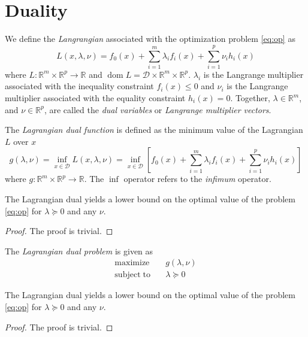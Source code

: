 \section{Duality}
We define the \emph{Langrangian} associated with the optimization problem \eqref{eq:op} as
\begin{equation}
L(x, \lambda, \nu) = f_0(x) + \sum_{i=1}^m \lambda_i f_i(x)
  + \sum_{i=1}^p \nu_i h_i(x)
\end{equation}
where $L: \mathbb{R}^m \times \mathbb{R}^p \rightarrow \mathbb{R}$ and $\operatorname{dom} L = \mathcal{D} \times \mathbb{R}^m \times \mathbb{R}^p$. $\lambda_i$ is the Langrange multiplier associated with the inequality constraint $f_i(x) \leq 0$ and $\nu_i$ is the Langrange multiplier associated with the equality constraint $h_i(x) = 0$. Together, $\lambda \in \mathbb{R}^m$, and $\nu \in \mathbb{R}^p$, are called the \emph{dual variables} or \emph{Langrange multiplier vectors}.

The \emph{Lagrangian dual function} is defined as the minimum value of the Lagrangian $L$ over $x$
\begin{equation}
g(\lambda, \nu) = \inf_{x \in \mathcal{D}} L(x, \lambda, \nu)
  = \inf_{x \in \mathcal{D}} \left[ f_0(x) + \sum_{i=1}^m \lambda_i f_i(x)
    + \sum_{i=1}^p \nu_i h_i(x) \right]
\end{equation}
where $g: \mathbb{R}^m \times \mathbb{R}^p \rightarrow \mathbb{R}$. The $\inf$ operator refers to the \emph{infimum} operator.

\begin{theorem}
  The Lagrangian dual yields a lower bound on the optimal value of the problem \eqref{eq:op} for $\lambda \succeq 0$ and any $\nu$.
\end{theorem}
\begin{proof}
  The proof is trivial.
\end{proof}

The \emph{Lagrangian dual problem} is given as
\begin{align} \label{eq:dualop}
\mathrm{maximize}    \quad & g(\lambda, \nu) \nonumber \\
\mathrm{subject\;to} \quad & \lambda \succeq 0
\end{align}

\begin{theorem}
  The Lagrangian dual yields a lower bound on the optimal value of the problem \eqref{eq:op} for $\lambda \succeq 0$ and any $\nu$.
\end{theorem}
\begin{proof}
  The proof is trivial.
\end{proof}

